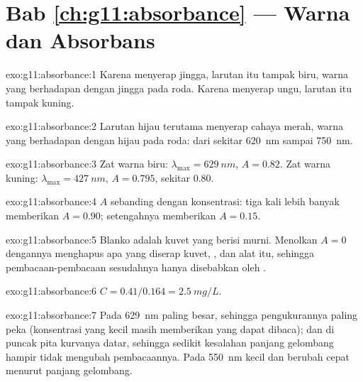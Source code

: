 \section*{Bab \ref{ch:g11:absorbance} --- Warna dan Absorbans}

\begin{solution}{exo:g11:absorbance:1}
Karena menyerap jingga, larutan itu tampak biru, warna yang berhadapan
dengan jingga pada roda. Karena menyerap ungu, larutan itu tampak
kuning.
\end{solution}

\begin{solution}{exo:g11:absorbance:2}
Larutan hijau terutama menyerap cahaya merah, warna yang berhadapan
dengan hijau pada roda: dari sekitar \qty{620}{nm} sampai \qty{750}{nm}.
\end{solution}

\begin{solution}{exo:g11:absorbance:3}
Zat warna biru: $\lambda_{\max} = \qty{629}{nm}$, $A = 0.82$. Zat warna
kuning: $\lambda_{\max} = \qty{427}{nm}$, $A = 0.795$, sekitar 0.80.
\end{solution}

\begin{solution}{exo:g11:absorbance:4}
$A$ sebanding dengan konsentrasi: tiga kali lebih banyak memberikan
$A = 0.90$; setengahnya memberikan $A = 0.15$.
\end{solution}

\begin{solution}{exo:g11:absorbance:5}
Blanko adalah kuvet yang berisi  murni. Menolkan $A = 0$ dengannya
menghapus apa yang diserap kuvet, , dan alat itu, sehingga
pembacaan-pembacaan sesudahnya hanya disebabkan oleh .
\end{solution}

\begin{solution}{exo:g11:absorbance:6}
$C = 0.41 / 0.164 = \qty{2.5}{mg/L}$.
\end{solution}

\begin{solution}{exo:g11:absorbance:7}
Pada \qty{629}{nm}  paling besar, sehingga pengukurannya
paling peka (konsentrasi yang kecil masih memberikan  yang
dapat dibaca); dan di puncak pita kurvanya datar, sehingga sedikit
kesalahan panjang gelombang hampir tidak mengubah pembacaannya. Pada
\qty{550}{nm}  kecil dan berubah cepat menurut panjang
gelombang.
\end{solution}

